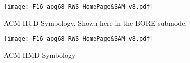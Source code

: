\begin{figure}[htbp]
    \centering
    \texttt{[image: F16\_apg68\_RWS\_HomePage\&SAM\_v8.pdf]}
    \caption{ACM HUD Symbology. Shown here in the BORE submode.}
\end{figure}

\begin{figure}[htbp]
    \centering
    \texttt{[image: F16\_apg68\_RWS\_HomePage\&SAM\_v8.pdf]}
    \caption{ACM HMD Symbology}
\end{figure}

